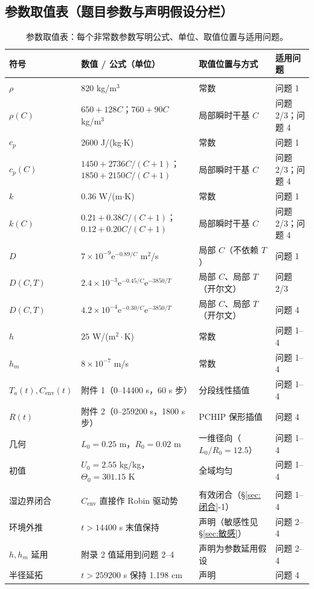 \documentclass[12pt,a4paper]{ctexart}
\numberwithin{equation}{section}
\begin{document}
\subsection{参数取值表（题目参数与声明假设分栏）}
\begin{table}[htbp]
\centering
\caption{参数取值表：每个非常数参数写明公式、单位、取值位置与适用问题。}
\label{tab:参数}
\small
\begin{tabular}{>{\raggedright\arraybackslash}p{2.4cm}>{\raggedright\arraybackslash}p{4.7cm}>{\raggedright\arraybackslash}p{4.2cm}>{\raggedright\arraybackslash}p{2.8cm}}
\toprule
符号 & 数值 / 公式（单位） & 取值位置与方式 & 适用问题 \\
\midrule
\multicolumn{4}{l}{\textit{题目给定（附录与附件）}} \\
$\rho$ & $820$ kg/m$^3$ & 常数 & 问题 1 \\
$\rho(C)$ & $650+128C$；$760+90C$ kg/m$^3$ & 局部瞬时干基 $C$ & 问题 2/3；问题 4 \\
$c_p$ & $2600$ J/(kg$\cdot$K) & 常数 & 问题 1 \\
$c_p(C)$ & $1450+2736C/(C+1)$；$1850+2150C/(C+1)$ & 局部瞬时干基 $C$ & 问题 2/3；问题 4 \\
$k$ & $0.36$ W/(m$\cdot$K) & 常数 & 问题 1 \\
$k(C)$ & $0.21+0.38C/(C+1)$；$0.12+0.20C/(C+1)$ & 局部瞬时干基 $C$ & 问题 2/3；问题 4 \\
$D$ & $7\times10^{-9}\mathrm{e}^{-0.89/C}$ m$^2$/s & 局部 $C$（不依赖 $T$） & 问题 1 \\
$D(C,T)$ & $2.4\times10^{-3}\mathrm{e}^{-0.45/C}\mathrm{e}^{-3850/T}$ & 局部 $C$、局部 $T$（开尔文） & 问题 2/3 \\
$D(C,T)$ & $4.2\times10^{-4}\mathrm{e}^{-0.30/C}\mathrm{e}^{-3850/T}$ & 局部 $C$、局部 $T$（开尔文） & 问题 4 \\
$h$ & $25$ W/(m$^2\cdot$K) & 常数 & 问题 1--4 \\
$h_m$ & $8\times10^{-7}$ m/s & 常数 & 问题 1--4 \\
$T_a(t),C_{\mathrm{env}}(t)$ & 附件 1（0--14400 s，60 s 步） & 分段线性插值 & 问题 1--4 \\
$R(t)$ & 附件 2（0--259200 s，1800 s 步） & PCHIP 保形插值 & 问题 4 \\
几何 & $L_0=0.25$ m，$R_0=0.02$ m & 一维径向（$L_0/R_0=12.5$） & 问题 1--4 \\
初值 & $U_0=2.55$ kg/kg，$\varTheta_0=301.15$ K & 全域均匀 & 问题 1--4 \\
\midrule
\multicolumn{4}{l}{\textit{声明假设（题目未给定，本文声明并前置）}} \\
湿边界闭合 & $C_{\mathrm{env}}$ 直接作 Robin 驱动势 & 有效闭合（\S\ref{sec:闭合}-1） & 问题 1--4 \\
环境外推 & $t>14400$ s 末值保持 & 声明（敏感性见 \S\ref{sec:敏感}） & 问题 2--4 \\
$h,h_m$ 延用 & 附录 2 值延用到问题 2--4 & 声明为参数延用假设 & 问题 2--4 \\
半径延拓 & $t>259200$ s 保持 1.198 cm & 声明 & 问题 4 \\
\bottomrule
\end{tabular}
\end{table}
\end{document}
